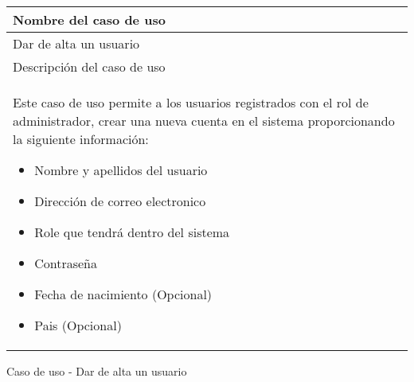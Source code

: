 \begin{identificacionCasoDeUso}
	\begin{tabular} { | p{17cm} |}

		\hline
		Nombre del caso de uso                  \\ \hline
		Dar de alta un usuario                  \\ \hline
		Descripción del caso de uso             \\ \hline
		Este caso de uso permite a los usuarios registrados con el rol de administrador, crear una nueva cuenta en el sistema proporcionando la siguiente información:
		\begin{itemize}
			\item Nombre y apellidos del usuario
			\item Dirección de correo electronico
			\item Role que tendrá dentro del sistema
			\item Contraseña
			\item Fecha de nacimiento (Opcional)
			\item Pais (Opcional)
		\end{itemize} \\ \hline
	\end{tabular}
	\caption{Caso de uso - Dar de alta un usuario}
\end{identificacionCasoDeUso}